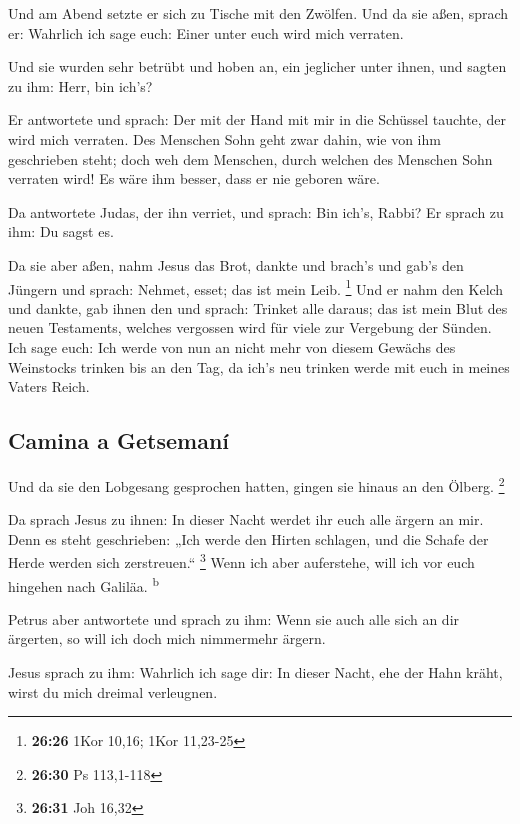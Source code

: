  Und am Abend setzte er sich zu Tische mit den Zwölfen.
 Und da sie aßen, sprach er: Wahrlich ich sage euch:
Einer unter euch wird mich verraten.

 Und sie wurden sehr betrübt und hoben an, ein jeglicher
unter ihnen, und sagten zu ihm: Herr, bin ich's?

 Er antwortete und sprach: Der mit der Hand mit mir in
die Schüssel tauchte, der wird mich verraten.  Des
Menschen Sohn geht zwar dahin, wie von ihm geschrieben steht; doch weh
dem Menschen, durch welchen des Menschen Sohn verraten wird! Es wäre ihm
besser, dass er nie geboren wäre.

 Da antwortete Judas, der ihn verriet, und sprach: Bin
ich's, Rabbi? Er sprach zu ihm: Du sagst es.

 Da sie aber aßen, nahm Jesus das Brot, dankte und
brach's und gab's den Jüngern und sprach: Nehmet, esset; das ist mein
Leib. \footnote{\textbf{26:26} 1Kor 10,16; 1Kor 11,23-25}
 Und er nahm den Kelch und dankte, gab ihnen den und
sprach: Trinket alle daraus;  das ist mein Blut des neuen
Testaments, welches vergossen wird für viele zur Vergebung der Sünden.
 Ich sage euch: Ich werde von nun an nicht mehr von
diesem Gewächs des Weinstocks trinken bis an den Tag, da ich's neu
trinken werde mit euch in meines Vaters Reich.

\hypertarget{camina-a-getsemanuxed}{%
\subsection{Camina a Getsemaní}\label{camina-a-getsemanuxed}}

 Und da sie den Lobgesang gesprochen hatten, gingen sie
hinaus an den Ölberg. \footnote{\textbf{26:30} Ps 113,1-118}

 Da sprach Jesus zu ihnen: In dieser Nacht werdet ihr
euch alle ärgern an mir. Denn es steht geschrieben: „Ich werde den
Hirten schlagen, und die Schafe der Herde werden sich zerstreuen.``
\footnote{\textbf{26:31} Joh 16,32}  Wenn ich aber
auferstehe, will ich vor euch hingehen nach Galiläa. \textsuperscript{b}

 Petrus aber antwortete und sprach zu ihm: Wenn sie auch
alle sich an dir ärgerten, so will ich doch mich nimmermehr ärgern.

 Jesus sprach zu ihm: Wahrlich ich sage dir: In dieser
Nacht, ehe der Hahn kräht, wirst du mich dreimal verleugnen.

